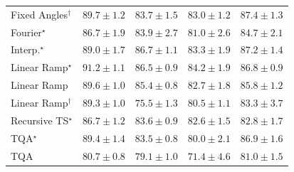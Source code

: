 \begin{tabular}{l|cccc|}
Fixed Angles$^\dagger$ & {\cellcolor[HTML]{004F2D}} \color[HTML]{F1F1F1} $89.7\pm 1.2$ & {\cellcolor[HTML]{076D39}} \color[HTML]{F1F1F1} $83.7\pm 1.5$ & {\cellcolor[HTML]{0A703A}} \color[HTML]{F1F1F1} $83.0\pm 1.2$ & {\cellcolor[HTML]{005B32}} \color[HTML]{F1F1F1} $87.4\pm 1.3$ \\
Fourier$^\star$ & {\cellcolor[HTML]{005E33}} \color[HTML]{F1F1F1} $86.7\pm 1.9$ & {\cellcolor[HTML]{066D39}} \color[HTML]{F1F1F1} $83.9\pm 2.7$ & {\cellcolor[HTML]{15793E}} \color[HTML]{F1F1F1} $81.0\pm 2.6$ & {\cellcolor[HTML]{016937}} \color[HTML]{F1F1F1} $84.7\pm 2.1$ \\
Interp.$^\star$ & {\cellcolor[HTML]{00522E}} \color[HTML]{F1F1F1} $89.0\pm 1.7$ & {\cellcolor[HTML]{005E33}} \color[HTML]{F1F1F1} $86.7\pm 1.1$ & {\cellcolor[HTML]{096F3A}} \color[HTML]{F1F1F1} $83.3\pm 1.9$ & {\cellcolor[HTML]{005C32}} \color[HTML]{F1F1F1} $87.2\pm 1.4$ \\
Linear Ramp$^\star$ & {\cellcolor[HTML]{004629}} \color[HTML]{F1F1F1} $91.2\pm 1.1$ & {\cellcolor[HTML]{005F34}} \color[HTML]{F1F1F1} $86.5\pm 0.9$ & {\cellcolor[HTML]{056C39}} \color[HTML]{F1F1F1} $84.2\pm 1.9$ & {\cellcolor[HTML]{005E33}} \color[HTML]{F1F1F1} $86.8\pm 0.9$ \\
Linear Ramp & {\cellcolor[HTML]{004F2D}} \color[HTML]{F1F1F1} $89.6\pm 1.0$ & {\cellcolor[HTML]{006636}} \color[HTML]{F1F1F1} $85.4\pm 0.8$ & {\cellcolor[HTML]{0C723B}} \color[HTML]{F1F1F1} $82.7\pm 1.8$ & {\cellcolor[HTML]{006435}} \color[HTML]{F1F1F1} $85.8\pm 1.2$ \\
Linear Ramp$^\dagger$ & {\cellcolor[HTML]{00512E}} \color[HTML]{F1F1F1} $89.3\pm 1.0$ & {\cellcolor[HTML]{30954F}} \color[HTML]{F1F1F1} $75.5\pm 1.3$ & {\cellcolor[HTML]{187B3F}} \color[HTML]{F1F1F1} $80.5\pm 1.1$ & {\cellcolor[HTML]{096F3A}} \color[HTML]{F1F1F1} $83.3\pm 3.7$ \\
Recursive TS$^\star$ & {\cellcolor[HTML]{005E33}} \color[HTML]{F1F1F1} $86.7\pm 1.2$ & {\cellcolor[HTML]{076D39}} \color[HTML]{F1F1F1} $83.6\pm 0.9$ & {\cellcolor[HTML]{0C723B}} \color[HTML]{F1F1F1} $82.6\pm 1.5$ & {\cellcolor[HTML]{0B713B}} \color[HTML]{F1F1F1} $82.8\pm 1.7$ \\
TQA$^\star$ & {\cellcolor[HTML]{00502D}} \color[HTML]{F1F1F1} $89.4\pm 1.4$ & {\cellcolor[HTML]{086E3A}} \color[HTML]{F1F1F1} $83.5\pm 0.8$ & {\cellcolor[HTML]{1A7D40}} \color[HTML]{F1F1F1} $80.0\pm 2.1$ & {\cellcolor[HTML]{005D33}} \color[HTML]{F1F1F1} $86.9\pm 1.6$ \\
TQA & {\cellcolor[HTML]{177B3F}} \color[HTML]{F1F1F1} $80.7\pm 0.8$ & {\cellcolor[HTML]{1F8142}} \color[HTML]{F1F1F1} $79.1\pm 1.0$ & {\cellcolor[HTML]{45AD5F}} \color[HTML]{F1F1F1} $71.4\pm 4.6$ & {\cellcolor[HTML]{15793E}} \color[HTML]{F1F1F1} $81.0\pm 1.5$ \\

\end{tabular}

